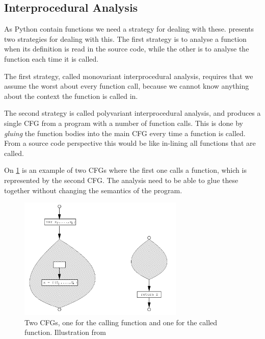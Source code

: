 \subsection{Interprocedural Analysis}
As Python contain functions we need a strategy for dealing with these.
\citet{schwartzbach} presents two strategies for dealing with this.
The first strategy is to analyse a function when its definition is read in the source code, while the other is to analyse the function each time it is called.

The first strategy, called monovariant interprocedural analysis, requires that we assume the worst about every function call, because we cannot know anything about the context the function is called in.

The second strategy is called polyvariant interprocedural analysis, and produces a single CFG from a program with a number of function calls.
This is done by \emph{gluing} the function bodies into the main CFG every time a function is called.
From a source code perspective this would be like in-lining all functions that are called.


On \cref{interprocedural_cfgs} is an example of two CFGs where the first one calls a function, which is represented by the second CFG.
The analysis need to be able to glue these together without changing the semantics of the program.

\begin{figure}[H]
  \center
  \includegraphics[width=0.7\textwidth]{figures/interprocedural_cfgs}
  \caption{Two CFGs, one for the calling function and one for the called function. Illustration from \citet[p.~37]{schwartzbach}}
  \label{interprocedural_cfgs}
\end{figure}


